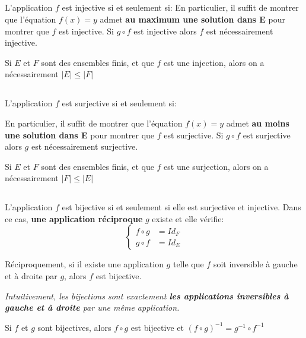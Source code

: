\subsection*{}

L'application \(f\) est injective si et seulement si:
En particulier, il suffit de montrer que l'équation \(f(x) = y\) admet \textbf{au maximum une solution dans E} pour montrer que \(f\) est injective.\+
Si \(g \circ f\) est injective alors \(f\) est nécessairement injective.\<

Si \(E\) et \(F\) sont des ensembles finis, et que \(f\) est une injection, alors on a nécessairement \(|E| \leq |F|\)

\subsection*{}

L'application \(f\) est surjective si et seulement si:

En particulier, il suffit de montrer que l'équation \(f(x) = y\) admet \textbf{au moins une solution dans E} pour montrer que \(f\) est surjective.\+
Si \(g \circ f\) est surjective alors \(g\) est nécessairement surjective.\<

Si \(E\) et \(F\) sont des ensembles finis, et que \(f\) est une surjection, alors on a nécessairement \(|F| \leq |E|\)

\subsection*{}

L'application \(f\) est bijective si et seulement si elle est surjective et injective.\+  
Dans ce cas, \textbf{une application réciproque} \(g\) existe et elle vérifie:
\[
    \begin{cases}
        f \circ g &= Id_F \\
        g \circ f &= Id_E
    \end{cases}
\]


Réciproquement, si il existe une application \(g\) telle que \(f\) soit inversible à gauche et à droite par \(g\), alors \(f\) est bijective.
\begin{center}
    \textit{
        Intuitivement, les bijections sont exactement \textbf{les applications inversibles à gauche et à droite} par une même application.
    }
\end{center}
Si \(f\) et \(g\) sont bijectives, alors \(f \circ g\) est bijective et \((f \circ g)^{-1} = g^{-1} \circ f^{-1}\)

